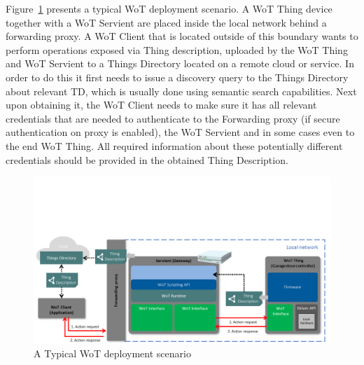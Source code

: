 
Figure~\ref{fig-wot-scenario} presents a typical WoT deployment scenario. 
A WoT Thing device together with a WoT Servient are placed inside the local network behind a forwarding proxy. 
A WoT Client that is located outside of this boundary wants to perform operations exposed via Thing description, uploaded by the WoT Thing and WoT Servient to a Things Directory located on a remote cloud or service. 
In order to do this it first needs to issue a discovery query to the Things Directory about relevant TD, which is usually done using semantic search capabilities. 
Next upon obtaining it, the WoT Client needs to make sure it has all relevant credentials that are needed to authenticate to the Forwarding proxy (if secure authentication on proxy is enabled), the WoT Servient and in some cases even to the end WoT Thing.
All required information about these potentially different credentials should be provided in the obtained Thing Description.  

\begin{figure}[!t]
\centering
\includegraphics[width=6in]{figures/wot-scenario.png}
\caption{A Typical WoT deployment scenario}
\label{fig-wot-scenario}
\end{figure}

